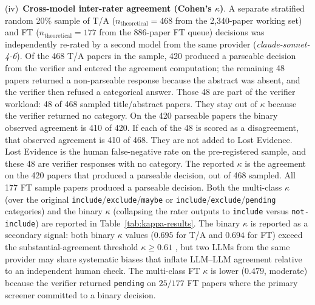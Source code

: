 (iv)~\textbf{Cross-model inter-rater agreement (Cohen's $\kappa$)}.
A separate stratified random 20\% sample of T/A ($n_{\text{theoretical}} = 468$ from
the 2{,}340-paper working set) and FT ($n_{\text{theoretical}} = 177$ from
the 886-paper FT queue) decisions was independently re-rated by a second
model from the same provider (\textit{claude-sonnet-4-6}). Of the
468 T/A papers in the sample, 420 produced a parseable decision from the
verifier and entered the agreement computation; the remaining 48 papers
returned a non-parseable response because the abstract was absent, and the
verifier then refused a categorical answer. Those 48 are part of the
verifier workload: 48 of 468 sampled title/abstract papers. They stay out
of $\kappa$ because the verifier returned no category. On the 420
parseable papers the binary observed agreement is 410 of 420. If each of
the 48 is scored as a disagreement, that observed agreement is 410 of 468.
They are not added to Lost Evidence. Lost Evidence is the human
false-negative rate on the pre-registered sample, and these 48 are
verifier responses with no category. The reported $\kappa$ is the
agreement on the 420 papers that produced a parseable decision, out of 468
sampled. All 177 FT
sample papers produced a parseable decision. Both the multi-class
$\kappa$ (over the original \texttt{include}/\texttt{exclude}/\texttt{maybe}
or \texttt{include}/\texttt{exclude}/\texttt{pending} categories) and the
binary $\kappa$ (collapsing the rater outputs to
\texttt{include} versus \texttt{not-include}) are reported in
Table~\ref{tab:kappa-results}. The binary $\kappa$ is reported as a
secondary signal: both binary $\kappa$ values ($0.695$ for T/A and $0.694$
for FT) exceed the substantial-agreement threshold $\kappa \geq 0.61$
\cite{landiskoch1977}, but two LLMs from the same provider may share
systematic biases that inflate LLM--LLM agreement relative to an independent
human check. The multi-class FT $\kappa$ is lower ($0.479$, moderate)
because the verifier returned \texttt{pending} on $25/177$ FT papers where
the primary screener committed to a binary decision.



